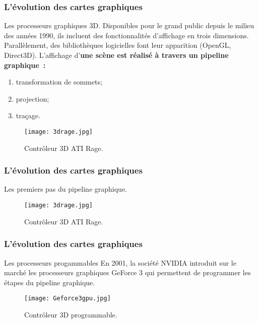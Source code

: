 \begin{frame}
  \frametitle{L'évolution des cartes graphiques}
\begin{block}{Les processeurs graphiques 3D.}
    Disponibles pour le grand public depuis le milieu des années 1990, ils incluent des fonctionnalités
    d'affichage en trois dimensions. Parallèlement, des bibliothèques logicielles font leur apparition
    (OpenGL, Direct3D). L'affichage d'\bf{une scène} est réalisé à travers un \bf{pipeline graphique}~: 
        
        \begin{enumerate}
            \item transformation de sommets;
            \item projection;
            \item traçage.
        \end{enumerate}
    
    \begin{figure}[htbp]
        \centering
       \texttt{[image: 3drage.jpg]} 
        \caption{Contrôleur 3D ATI Rage.}
        \label{fig:ati_rage}
    \end{figure}
\end{block}
\end{frame}

\begin{frame}
  \frametitle{L'évolution des cartes graphiques}
\begin{block}{Les premiers pas du pipeline graphique.}
    \begin{figure}[htbp]
        \centering
       \texttt{[image: 3drage.jpg]} 
        \caption{Contrôleur 3D ATI Rage.}
        \label{fig:ati_rage}
    \end{figure}
\end{block}
\end{frame}


\begin{frame}
  \frametitle{L'évolution des cartes graphiques}
\begin{block}{Les processeurs progammables}
    En 2001, la société NVIDIA introduit sur le marché les processeurs graphiques
    GeForce 3 qui permettent de programmer les étapes du pipeline graphique. 
    \begin{figure}[htbp]
        \centering
       \texttt{[image: Geforce3gpu.jpg]} 
        \caption{Contrôleur 3D programmable.}
        \label{fig:geforce3}
    \end{figure}
\end{block}
\end{frame}

